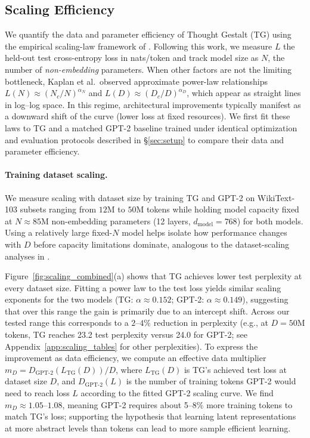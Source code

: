 \documentclass{article}
\begin{document}
\subsection{Scaling Efficiency} 
\label{sec:results-scaling}

We quantify the data and parameter efficiency of Thought Gestalt (TG) using the empirical scaling-law framework of \citet{kaplan2020scaling}. Following this work, we measure $L$ the held-out test cross-entropy loss in nats/token and track model size as $N$, the number of \emph{non-embedding} parameters. When other factors are not the limiting bottleneck, Kaplan et al.\ observed approximate power-law relationships
$L(N)\approx (N_c/N)^{\alpha_N}$ and $L(D)\approx (D_c/D)^{\alpha_D}$, which appear as straight lines in log--log space. In this regime, architectural improvements typically manifest as a downward shift of the curve (lower loss at fixed resources). We first fit these laws to TG and a matched GPT-2 baseline trained under identical optimization and evaluation protocols described in \S\ref{sec:setup} to compare their data and parameter efficiency.



\paragraph{Training dataset scaling.}
We measure scaling with dataset size by training TG and GPT-2 on WikiText-103 subsets ranging from $12$M to $50$M tokens while holding model capacity fixed at $N\approx85$M non-embedding parameters (12 layers, $d_{\text{model}}{=}768$) for both models.
Using a relatively large fixed-$N$ model helps isolate how performance changes with $D$ before capacity limitations dominate, analogous to the dataset-scaling analyses in \citet{kaplan2020scaling}.

Figure~\ref{fig:scaling_combined}(a) shows that TG achieves lower test perplexity at every dataset size. Fitting a power law to the test loss yields similar scaling exponents for the two models (TG: $\alpha\approx0.152$; GPT-2: $\alpha\approx0.149$), suggesting that over this range the gain is primarily due to an intercept shift. Across our tested range this corresponds to a $2$--$4\%$ reduction in perplexity (e.g., at $D{=}50$M tokens, TG reaches 23.2 test perplexity versus 24.0 for GPT-2; see Appendix~\ref{app:scaling_tables} for other perplexities).
To express the improvement as data efficiency, we compute an effective data multiplier $m_D = D_{\text{GPT-2}}(L_{\text{TG}}(D))/D$,
where $L_{\text{TG}}(D)$ is TG's achieved test loss at dataset size $D$, and $D_{\text{GPT-2}}(L)$ is the number of training tokens GPT-2 would need to reach loss $L$ according to the fitted GPT-2 scaling curve. We find $m_D\approx1.05$--$1.08$, meaning GPT-2 requires about 5--8\% more training tokens to match TG's loss; supporting the hypothesis that learning latent representations at more abstract levels than tokens can lead to more sample efficient learning.
\end{document}
